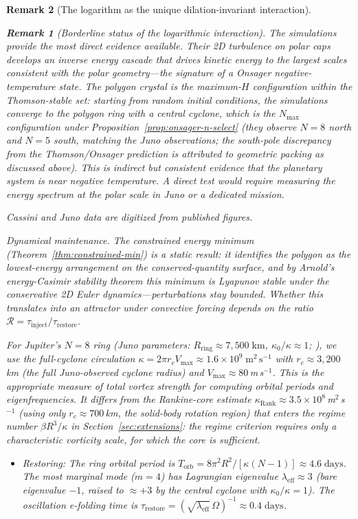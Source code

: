 \documentclass[12pt, a4paper]{article}
\newtheorem{remark}{Remark}[section]
\numberwithin{equation}{section}
\begin{document}
\begin{remark}[The logarithm as the unique dilation-invariant interaction]
\begin{remark}[Borderline status of the logarithmic interaction]
The \citet{Siegelman2022} simulations provide the most direct evidence
available.  Their 2D turbulence on polar caps develops an inverse energy
cascade that drives kinetic energy to the largest scales consistent with
the polar geometry---the signature of a Onsager negative-temperature
state.  The polygon crystal is the maximum-$H$ configuration within
the Thomson-stable set: starting from random initial conditions, the
simulations converge to the polygon ring with a central cyclone, which
is the $N_{\max}$ configuration under Proposition~\ref{prop:onsager-n-select}
(they observe $N = 8$ north and $N = 5$ south, matching the Juno
observations; the south-pole discrepancy from the Thomson/Onsager
prediction is attributed to geometric packing as discussed above).
This is indirect but consistent evidence that the planetary system is
near negative temperature.  A direct test would require measuring the
energy spectrum at the polar scale in Juno or a dedicated mission.

Cassini and Juno data are digitized from published figures.

\emph{Dynamical maintenance.}%
\label{sec:dynamical-maintenance}
The constrained energy minimum (Theorem~\ref{thm:constrained-min}) is
a static result: it identifies the polygon as the lowest-energy
arrangement on the conserved-quantity surface, and by Arnold's energy-Casimir
stability theorem \citep{Arnold1966} this minimum is Lyapunov stable
under the conservative 2D Euler dynamics---perturbations stay bounded.
Whether this translates into an attractor under convective forcing
depends on the ratio $\mathcal{R} = \tau_{\mathrm{inject}}/\tau_{\mathrm{restore}}$.

For Jupiter's $N=8$ ring (Juno parameters: $R_{\mathrm{ring}}\approx
7{,}500\;\mathrm{km}$, $\kappa_0/\kappa \approx 1$;
\citealt{Adriani2018}), we use the full-cyclone circulation
$\kappa = 2\pi r_c V_{\max} \approx 1.6\times10^9\;\mathrm{m^2\,s^{-1}}$
with $r_c\approx3{,}200$\,km (the full Juno-observed cyclone radius)
and $V_{\max}\approx80$\,m\,s$^{-1}$.  This is the appropriate measure
of total vortex strength for computing orbital periods and eigenfrequencies.
It differs from the Rankine-core estimate
$\kappa_{\mathrm{Rank}}\approx3.5\times10^8$\,m$^2$\,s$^{-1}$
(using only $r_c\approx700$\,km, the solid-body rotation region)
that enters the regime number $\beta R^3/\kappa$ in
Section~\ref{sec:extensions}: the regime criterion requires only a
characteristic vorticity scale, for which the core is sufficient.
\begin{itemize}
\item \emph{Restoring:} The ring orbital period is $T_{\mathrm{orb}} =
  8\pi^2 R^2/[\kappa(N{-}1)] \approx 4.6\;\mathrm{days}$.
  The most marginal mode ($m=4$) has Lagrangian eigenvalue
  $\lambda_{\mathrm{eff}} \approx 3$ (bare eigenvalue $-1$, raised to
  $\approx+3$ by the central cyclone with $\kappa_0/\kappa=1$).
  The oscillation e-folding time is
  $\tau_{\mathrm{restore}} = (\sqrt{\lambda_{\mathrm{eff}}}\,\Omega)^{-1}
  \approx 0.4\;\mathrm{days}$.


\end{itemize}
\end{remark}
\end{remark}
\end{document}
